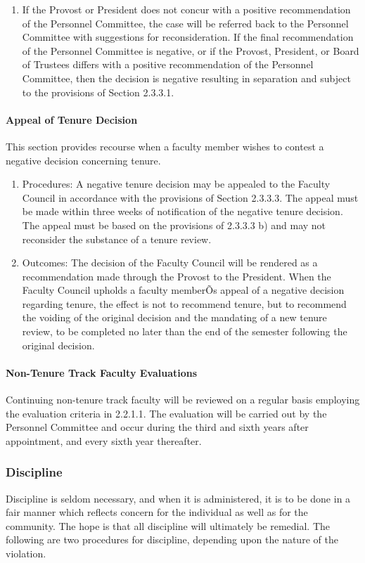 \documentclass[letterpaper, 11pt]{article}
\begin{document}
\begin{enumerate}[label=\alph*)]
{\begin{enumerate}[label=\arabic*)]
{\begin{enumerate}[label=()\alph*)]
								\end{enumerate}
							}
							\item{If the Provost or President does not concur with a positive recommendation of the Personnel Committee, the case will be referred back to the Personnel Committee with suggestions for reconsideration.  If the final recommendation of the Personnel Committee is negative, or if the Provost, President, or Board of Trustees differs with a positive recommendation of the Personnel Committee, then the decision is negative resulting in separation and subject to the provisions of Section 2.3.3.1.}
						\end{enumerate}
					}
				\end{enumerate}
			\paragraph{Appeal of Tenure Decision}
				This section provides recourse when a faculty member wishes to contest a negative decision concerning tenure.
				\begin{enumerate}[label=\alph*)]
					\item{Procedures:
						A negative tenure decision may be appealed to the Faculty Council in accordance with the provisions of Section 2.3.3.3.  The appeal must be made within three weeks of notification of the negative tenure decision.  The appeal must be based on the provisions of 2.3.3.3 b) and may not reconsider the substance of a tenure review.}
					\item{Outcomes:
						The decision of the Faculty Council will be rendered as a recommendation made through the Provost to the President.  When the Faculty Council upholds a faculty memberÕs appeal of a negative decision regarding tenure, the effect is not to recommend tenure, but to recommend the voiding of the original decision and the mandating of a new tenure review, to be completed no later than the end of the semester following the original decision.}
				\end{enumerate}
			\paragraph{Non-Tenure Track Faculty Evaluations}
				Continuing non-tenure track faculty will be reviewed on a regular basis employing the evaluation criteria in 2.2.1.1.  The evaluation will be carried out by the Personnel Committee and occur during the third and sixth years after appointment, and every sixth year thereafter.
		\subsubsection{Discipline}
			Discipline is seldom necessary, and when it is administered, it is to be done in a fair manner which reflects concern for the individual as well as for the community.  The hope is that all discipline will ultimately be remedial.  The following are two procedures for discipline, depending upon the nature of the violation.
\end{document}
